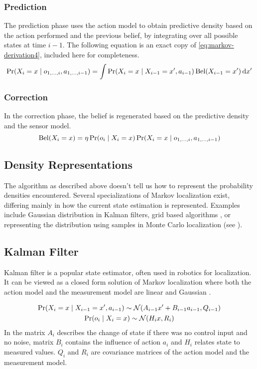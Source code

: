 \subsubsection{Prediction}
The prediction phase uses the action model to obtain predictive density based on the action performed
and the previous belief, by integrating over all possible states at time \(i - 1\).
The following equation is an exact copy of \eqref{eq:markov-derivation4}, included here for completeness.
\begin{equation}
	\label{eq:markov-prediction}
	\operatorname{\mathrm{Pr}}(X_i = x \mid o_{1, \dotsc, i}, a_{1, \dotsc, i - 1}) =
	\int
	\operatorname{\mathrm{Pr}}(X_i = x \mid X_{i - 1}=x', a_{i - 1})
	\operatorname{\mathrm{Bel}}(X_{i-1} = x')
	\,\mathrm{d}x'
\end{equation}

\subsubsection{Correction}
In the correction phase, the belief is regenerated based on the predictive density
and the sensor model.
\begin{equation}
	\label{eq:markov-correction}
	\operatorname{\mathrm{Bel}}(X_i = x) =
	\eta \operatorname{\mathrm{Pr}}(o_i \mid X_i = x)
	\operatorname{\mathrm{Pr}}(X_i = x \mid o_{1, \dotsc, i}, a_{1, \dotsc, i - 1})
\end{equation}

\subsection{Density Representations}
The algorithm as described above doesn't tell us how to represent the probability
densities encountered.
Several specializations of Markov localization exist, differing mainly in how the
current state estimation is represented.
Examples include Gaussian distribution in Kalman filters,
grid based algorithms \cite{fox98}, or representing the distribution
using samples in Monte Carlo localization (see ).

\subsection{Kalman Filter}
\label{sec:kalman}
Kalman filter \cite{kalman60,welch95} is a popular state estimator, often used in robotics
for localization.
It can be viewed as a closed form solution of Markov localization where both the
action model and the measurement model are linear and Gaussian \cite{diard03}.

\begin{gather}
	\label{eq:kalman-action-model}
	\operatorname{\mathrm{Pr}}(X_i = x \mid X_{i-1} = x', a_{i - 1}) \sim \operatorname{\mathcal{N}}(A_{i - 1}x' + B_{i - 1}a_{i - 1}, Q_{i - 1})
	\\
	\label{eq:kalman-measurement-model}
	\operatorname{\mathrm{Pr}}(o_{i} \mid X_i = x) \sim \operatorname{\mathcal{N}}(H_{i}x, R_i)
\end{gather}
In 
the matrix \(A_i\) describes the change of state if there was no control input and no noise,
matrix \(B_i\) contains the influence of action \(a_i\) and \(H_i\) relates state to measured
values.
\(Q_i\) and \(R_i\) are covariance matrices of the action model and the measurement model.

